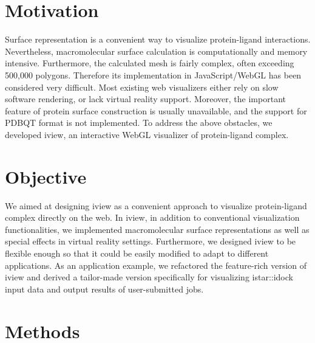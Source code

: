 \section{Motivation}

Surface representation is a convenient way to visualize protein-ligand interactions. Nevertheless, macromolecular surface calculation is computationally and memory intensive. Furthermore, the calculated mesh is fairly complex, often exceeding 500,000 polygons. Therefore its implementation in JavaScript/WebGL has been considered very difficult. Most existing web visualizers either rely on slow software rendering, or lack virtual reality support. Moreover, the important feature of protein surface construction is usually unavailable, and the support for PDBQT format is not implemented. To address the above obstacles, we developed iview, an interactive WebGL visualizer of protein-ligand complex.

\section{Objective}

We aimed at designing iview as a convenient approach to visualize protein-ligand complex directly on the web. In iview, in addition to conventional visualization functionalities, we implemented macromolecular surface representations as well as special effects in virtual reality settings. Furthermore, we designed iview to be flexible enough so that it could be easily modified to adapt to different applications. As an application example, we refactored the feature-rich version of iview and derived a tailor-made version specifically for visualizing istar::idock input data and output results of user-submitted jobs.

\section{Methods}

